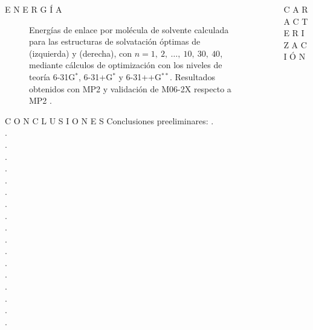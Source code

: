 \documentclass[final]{beamer}
\newlength{\sepwidth}
\newlength{\colwidth}
\newcommand{\separatorcolumn}{\begin{column}{\sepwidth}\end{column}}
\begin{document}
\begin{frame}[t]
\begin{columns}[t]
\begin{column}{\colwidth}
\begin{block}{E N E R G Í A}{}
\begin{figure}[H]
\begin{minipage}[b]{0.48\textwidth}
					\end{minipage}

					\caption{Energías de enlace por molécula de solvente calculada para las estructuras de solvatación óptimas de  (izquierda) y  (derecha), con $n = 1,\ 2,\ \ldots,\ 10,\ 30,\ 40$, mediante cálculos de optimización con los niveles de teoría 6-31G$^\ast$, 6-31+G$^\ast$ y 6-31++G$^{\ast\ast}$. Resultados obtenidos con MP2 \cite{Me-2022-01} y validación de M06-2X respecto a MP2 \cite{Me-2023-01}.}
					\label{fig:bases}
				\end{figure}
				
			\end{block}
			
			\begin{exampleblock}{C O N C L U S I O N E S}{}
				Conclusiones preeliminares:
				. \\
				. \\
				. \\
				. \\
				. \\
				. \\
				. \\
				. \\
				. \\
				. \\
				. \\
				. \\
				. \\
				. \\
				. \\
				. \\			
				. \\
				. \\


			\end{exampleblock}		

		\end{column}
	
		\separatorcolumn
		
		\begin{column}{\colwidth}
		
			\begin{block}{C A R A C T E R I Z A C I Ó N }{}
				

\end{block}
\end{column}
\end{columns}
\end{frame}
\end{document}
